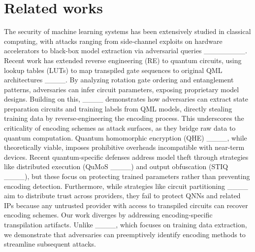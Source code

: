 \section{Related works}

The security of machine learning systems has been extensively studied in classical computing, with attacks ranging from side-channel exploits on hardware accelerators to black-box model extraction via adversarial queries ________. Recent work has extended reverse engineering (RE) to quantum circuits, using lookup tables (LUTs) to map transpiled gate sequences to original QML architectures ____. By analyzing rotation gate ordering and entanglement patterns, adversaries can infer circuit parameters, exposing proprietary model designs. Building on this, ____ demonstrates how adversaries can extract state preparation circuits and training labels from QML models, directly stealing training data by reverse-engineering the encoding process. This underscores the criticality of encoding schemes as attack surfaces, as they bridge raw data to quantum computation. Quantum homomorphic encryption (QHE) ____, while theoretically viable, imposes prohibitive overheads incompatible with near-term devices. Recent quantum-specific defenses address model theft through strategies like distributed execution (QuMoS ____) and output obfuscation (STIQ ____), but these focus on protecting trained parameters rather than preventing encoding detection. Furthermore, while strategies like circuit partitioning ____ aim to distribute trust across providers, they fail to protect QNNs and related IPs because any untrusted provider with access to transpiled circuits can recover encoding schemes. Our work diverges by addressing encoding-specific transpilation artifacts. Unlike ____, which focuses on training data extraction, we demonstrate that adversaries can preemptively identify encoding methods to streamline subsequent attacks.